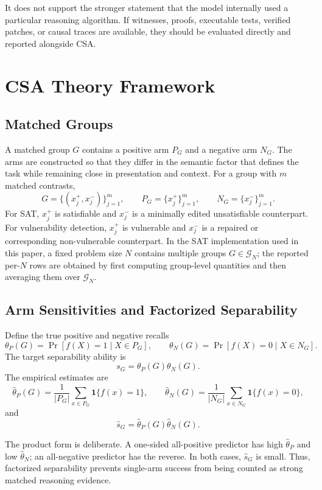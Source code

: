 \documentclass[10pt,conference]{IEEEtran}
\theoremstyle{remark}
\begin{document}
It does not support the stronger statement that the model internally used a particular reasoning algorithm.  If witnesses, proofs, executable tests, verified patches, or causal traces are available, they should be evaluated directly and reported alongside CSA.

\section{CSA Theory Framework}
\label{sec:supp-theory}

\subsection{Matched Groups}

A matched group $G$ contains a positive arm $P_G$ and a negative arm $N_G$.  The arms are constructed so that they differ in the semantic factor that defines the task while remaining close in presentation and context.  For a group with $m$ matched contrasts,
\[
G=\{(x_j^+,x_j^-)\}_{j=1}^{m},\qquad
P_G=\{x_j^+\}_{j=1}^{m},\qquad
N_G=\{x_j^-\}_{j=1}^{m}.
\]
For SAT, $x_j^+$ is satisfiable and $x_j^-$ is a minimally edited unsatisfiable counterpart.  For vulnerability detection, $x_j^+$ is vulnerable and $x_j^-$ is a repaired or corresponding non-vulnerable counterpart.  In the SAT implementation used in this paper, a fixed problem size $N$ contains multiple groups $G\in\mathcal{G}_N$; the reported per-$N$ rows are obtained by first computing group-level quantities and then averaging them over $\mathcal{G}_N$.

\subsection{Arm Sensitivities and Factorized Separability}

Define the true positive and negative recalls
\[
\theta_P(G)=\Pr[f(X)=1\mid X\in P_G],
\qquad
\theta_N(G)=\Pr[f(X)=0\mid X\in N_G].
\]
The target separability ability is
\[
s_G=\theta_P(G)\theta_N(G).
\]
The empirical estimates are
\[
\hat\theta_P(G)=
\frac{1}{|P_G|}
\sum_{x\in P_G}\mathbf{1}\{f(x)=1\},
\qquad
\hat\theta_N(G)=
\frac{1}{|N_G|}
\sum_{x\in N_G}\mathbf{1}\{f(x)=0\},
\]
and
\[
\hat{s}_G=\hat\theta_P(G)\hat\theta_N(G).
\]

The product form is deliberate.  A one-sided all-positive predictor has high $\hat\theta_P$ and low $\hat\theta_N$; an all-negative predictor has the reverse.  In both cases, $\hat{s}_G$ is small.  Thus, factorized separability prevents single-arm success from being counted as strong matched reasoning evidence.
\end{document}
